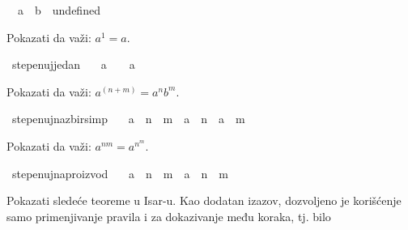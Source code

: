 \begin{isabellebody}
\begin{exercise}[subtitle=Zasnivanje prirodnih brojeva.]
\ \ {\isachardoublequoteopen}a\ {\isasymZcat}\ b\ {\isacharequal}{\kern0pt}\ undefined{\isachardoublequoteclose}%
\begin{isamarkuptext}%
Pokazati da važi: $a^1 = a$.%
\end{isamarkuptext}\isamarkuptrue%
\isamarkupfalse%
\ stepenuj{\isacharunderscore}{\kern0pt}jedan{\isacharcolon}{\kern0pt}\isanewline
\ \ \ {\isachardoublequoteopen}a\ {\isasymZcat}\ {\isasymone}\ {\isacharequal}{\kern0pt}\ a{\isachardoublequoteclose}\isanewline
\ \ %
\isadelimproof
%
\endisadelimproof
%
\isatagproof
%
\endisatagproof
{\isafoldproof}%
%
\isadelimproof
%
\endisadelimproof
%
\begin{isamarkuptext}%
Pokazati da važi: $a^{(n+m)} = a^n b^m$.%
\end{isamarkuptext}\isamarkuptrue%
\isamarkupfalse%
\ stepenuj{\isacharunderscore}{\kern0pt}na{\isacharunderscore}{\kern0pt}zbir{\isacharbrackleft}{\kern0pt}simp{\isacharbrackright}{\kern0pt}{\isacharcolon}{\kern0pt}\isanewline
\ \ \ {\isachardoublequoteopen}a\ {\isasymZcat}\ {\isacharparenleft}{\kern0pt}n\ {\isasymoplus}\ m{\isacharparenright}{\kern0pt}\ {\isacharequal}{\kern0pt}\ a\ {\isasymZcat}\ n\ {\isasymotimes}\ a\ {\isasymZcat}\ m{\isachardoublequoteclose}\isanewline
\ \ %
\isadelimproof
%
\endisadelimproof
%
\isatagproof
%
\endisatagproof
{\isafoldproof}%
%
\isadelimproof
%
\endisadelimproof
%
\begin{isamarkuptext}%
Pokazati da važi: $a^{nm} = a^{n^m}$.%
\end{isamarkuptext}\isamarkuptrue%
\isamarkupfalse%
\ stepenuj{\isacharunderscore}{\kern0pt}na{\isacharunderscore}{\kern0pt}proizvod{\isacharcolon}{\kern0pt}\isanewline
\ \ \ {\isachardoublequoteopen}a\ {\isasymZcat}\ {\isacharparenleft}{\kern0pt}n\ {\isasymotimes}\ m{\isacharparenright}{\kern0pt}\ {\isacharequal}{\kern0pt}\ {\isacharparenleft}{\kern0pt}a\ {\isasymZcat}\ n{\isacharparenright}{\kern0pt}\ {\isasymZcat}\ m{\isachardoublequoteclose}\isanewline
\ \ %
\isadelimproof
%
\endisadelimproof
%
\isatagproof
%
\endisatagproof
{\isafoldproof}%
%
\isadelimproof
%
\endisadelimproof
%
\end{exercise}
%
\begin{exercise}[subtitle=Dodatni primeri.]
%
\begin{isamarkuptext}%
Pokazati sledeće teoreme u Isar-u. Kao dodatan izazov, dozvoljeno je korišćenje samo 
      primenjivanje pravila  i  za dokazivanje među koraka, tj. bilo

\end{isamarkuptext}
\end{exercise}
\end{isabellebody}

